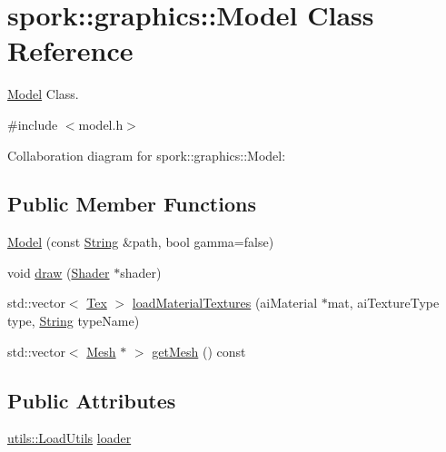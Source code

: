 \hypertarget{classspork_1_1graphics_1_1_model}{}\section{spork\+:\+:graphics\+:\+:Model Class Reference}
\label{classspork_1_1graphics_1_1_model}


\hyperlink{classspork_1_1graphics_1_1_model}{Model} Class.  




{\ttfamily \#include $<$model.\+h$>$}



Collaboration diagram for spork\+:\+:graphics\+:\+:Model\+:
\subsection*{Public Member Functions}
\begin{DoxyCompactItemize}
\item 
\hyperlink{classspork_1_1graphics_1_1_model_a774761cdfe1a21c1eb9223fc4adf7261}{Model} (const \hyperlink{my_string_8h_afbeda3fd1bdc8c37d01bdf9f5c8274ff}{String} \&path, bool gamma=false)
\item 
void \hyperlink{classspork_1_1graphics_1_1_model_a35ded645db58e34f4404c7fa280767d0}{draw} (\hyperlink{classspork_1_1graphics_1_1_shader}{Shader} $\ast$shader)
\item 
std\+::vector$<$ \hyperlink{structspork_1_1graphics_1_1_tex}{Tex} $>$ \hyperlink{classspork_1_1graphics_1_1_model_a728a70e87b9a8cc83f746787219fb373}{load\+Material\+Textures} (ai\+Material $\ast$mat, ai\+Texture\+Type type, \hyperlink{my_string_8h_afbeda3fd1bdc8c37d01bdf9f5c8274ff}{String} type\+Name)
\item 
std\+::vector$<$ \hyperlink{classspork_1_1graphics_1_1_mesh}{Mesh} $\ast$ $>$ \hyperlink{classspork_1_1graphics_1_1_model_a8944e099bc13464e73e566d13b834216}{get\+Mesh} () const
\end{DoxyCompactItemize}
\subsection*{Public Attributes}
\begin{DoxyCompactItemize}
\item 
\hyperlink{classspork_1_1utils_1_1_load_utils}{utils\+::\+Load\+Utils} \hyperlink{classspork_1_1graphics_1_1_model_a5903a26db77455961781ab0da24c0638}{loader}
\end{DoxyCompactItemize}
